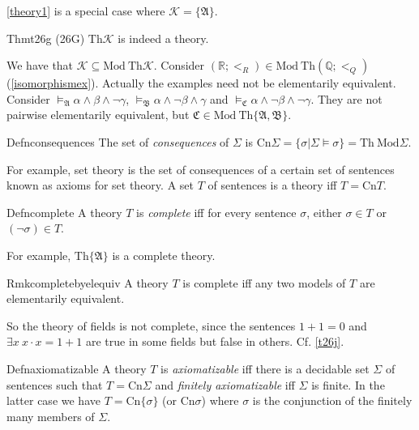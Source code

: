 \ref{theory1} is a special case where $\mathcal{K}=\{\mathfrak{A}\}.$

\begin{reference}{Thm}{t26g}
  (26G) $\mathrm{Th}\mathcal{K}$ is indeed a theory.
\end{reference}

We have that $\mathcal{K}\subseteq \mathrm{Mod\ Th}\mathcal{K}$. Consider $(\mathbb{R};<_R)\in \mathrm{Mod\ Th}(\mathbb{Q};<_Q)$ (\ref{isomorphismex}). Actually the examples need not be elementarily equivalent. Consider $\vDash_{\mathfrak{A}}\alpha\wedge \beta\wedge\neg \gamma$, $\vDash_{\mathfrak{B}}\alpha\wedge\neg\beta\wedge\gamma$ and $\vDash_{\mathfrak{C}}\alpha\wedge\neg\beta\wedge\neg\gamma$. They are not pairwise elementarily equivalent, but $\mathfrak{C}\in \mathrm{Mod\ Th}\{\mathfrak{A},\mathfrak{B}\}$.

\begin{reference}{Defn}{consequences}
  The set of \textit{consequences} of $\Sigma$ is $\mathrm{Cn}\Sigma=\{\sigma|\Sigma\vDash \sigma\}=\mathrm{Th\ Mod}\Sigma$.
\end{reference}

For example, set theory is the set of consequences of a certain set of sentences known as axioms for set theory. A set $T$ of sentences is a theory iff $T=\mathrm{Cn}T$.

\begin{reference}{Defn}{complete}
  A theory $T$ is \textit{complete} iff for every sentence $\sigma$, either $\sigma\in T$ or $(\neg \sigma)\in T$.
\end{reference}

For example, $\mathrm{Th}\{\mathfrak{A}\}$ is a complete theory.

\begin{reference}{Rmk}{completebyelequiv}
  A theory $T$ is complete iff any two models of $T$ are elementarily equivalent.
\end{reference}

So the theory of fields is not complete, since the sentences $1+1=0$ and $\exists x\ x\cdot x=1+1$ are true in some fields but false in others. Cf. \ref{t26j}.

\begin{reference}{Defn}{axiomatizable}
  A theory $T$ is \textit{axiomatizable} iff there is a decidable set $\Sigma$ of sentences such that $T=\mathrm{Cn}\Sigma$ and \textit{finitely axiomatizable} iff $\Sigma$ is finite. In the latter case we have $T=\mathrm{Cn}\{\sigma\}$ (or $\mathrm{Cn}\sigma$) where $\sigma$ is the conjunction of the finitely many members of $\Sigma$.
\end{reference}

